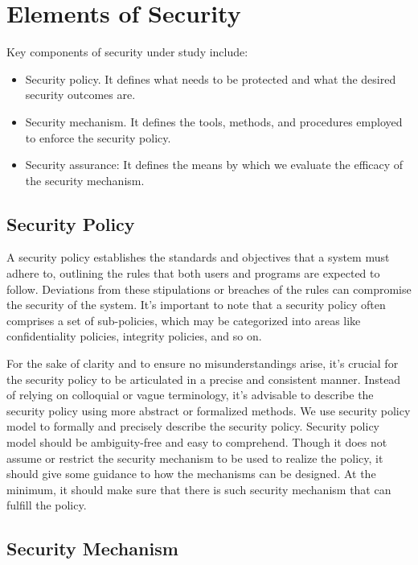 \section{Elements of Security}

Key components of security under study include:
\begin{itemize}
	\item Security policy. It defines what needs to be protected and what the desired security outcomes are.
	\item Security mechanism. It defines the tools, methods, and procedures employed to enforce the security policy.
	\item Security assurance: It defines the means by which we evaluate the efficacy of the security mechanism.
\end{itemize}

\subsection{Security Policy}

A security policy establishes the standards and objectives that a system must adhere to, outlining the rules that both users and programs are expected to follow. Deviations from these stipulations or breaches of the rules can compromise the security of the system. It's important to note that a security policy often comprises a set of sub-policies, which may be categorized into areas like confidentiality policies, integrity policies, and so on.

For the sake of clarity and to ensure no misunderstandings arise, it's crucial for the security policy to be articulated in a precise and consistent manner. Instead of relying on colloquial or vague terminology, it's advisable to describe the security policy using more abstract or formalized methods. We use security policy model to formally and precisely describe the security policy. Security policy model should be ambiguity-free and easy to comprehend. Though it does not assume or restrict the security mechanism to be used to realize the policy, it should give some guidance to how the mechanisms can be designed. At the minimum, it should make sure that there is such security mechanism that can fulfill the policy.

\subsection{Security Mechanism}

















